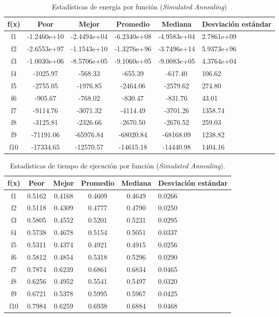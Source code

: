 \documentclass[12pt,twoside]{report}
\begin{document}
	\begin{table}[H]
		\centering
		\begin{tabular}{|c|c|c|c|c|p{2.1cm}|}  
			\hline
			\textbf{f(x)} & \textbf{Peor} & \textbf{Mejor} & \textbf{Promedio} & \textbf{Mediana} & \textbf{Desviación estándar} \\  
			\hline
			f1  & -1.2460e+10 & -2.4494e+04 & -6.2340e+08 & -4.9583e+04 & 2.7861e+09 \\
			f2  & -2.6553e+97  & -1.1543e+10  & -1.3276e+96  & -3.7496e+14  & 5.9373e+96 \\
			f3  & -1.0030e+06  & -8.5706e+05  & -9.1060e+05  & -9.0083e+05  & 4.3764e+04 \\
			f4  & -1025.97     & -568.33     & -655.39     & -617.40     & 106.62 \\
			f5  & -2755.05     & -1976.85    & -2464.06    & -2579.62    & 274.80 \\
			f6  & -905.67      & -768.02     & -830.47     & -831.76     & 43.01 \\
			f7  & -9114.76     & -3071.32    & -4114.49    & -3701.26    & 1358.74 \\
			f8  & -3125.81     & -2326.66    & -2670.50    & -2676.52    & 259.03 \\
			f9  & -71191.06    & -65976.84   & -68020.84   & -68168.09   & 1238.82 \\
			f10 & -17334.65    & -12570.57   & -14615.18   & -14440.98   & 1404.16 \\
			\hline
		\end{tabular}
		\caption{Estadísticas de energía por función (\textit{Simulated Annealing})}
		\label{tab:res_sa}
	\end{table}
	
	
	
	
	\begin{table}[H]
		\centering
		\begin{tabular}{|c|c|c|c|c|p{2.1cm}|}  
			\hline
			\textbf{f(x)} & \textbf{Peor} & \textbf{Mejor} & \textbf{Promedio} & \textbf{Mediana} & \textbf{Desviación estándar} \\  
			\hline
			f1  & 0.5162 & 0.4168 & 0.4609 & 0.4649 & 0.0266 \\
			f2  & 0.5118 & 0.4309 & 0.4777 & 0.4790 & 0.0250 \\
			f3  & 0.5805 & 0.4552 & 0.5201 & 0.5231 & 0.0295 \\
			f4  & 0.5738 & 0.4678 & 0.5154 & 0.5051 & 0.0337 \\
			f5  & 0.5311 & 0.4374 & 0.4921 & 0.4915 & 0.0256 \\
			f6  & 0.5812 & 0.4854 & 0.5318 & 0.5296 & 0.0290 \\
			f7  & 0.7874 & 0.6239 & 0.6861 & 0.6834 & 0.0465 \\
			f8  & 0.6256 & 0.4952 & 0.5541 & 0.5497 & 0.0320 \\
			f9  & 0.6721 & 0.5378 & 0.5995 & 0.5967 & 0.0425 \\
			f10 & 0.7984 & 0.6259 & 0.6938 & 0.6884 & 0.0468 \\
			\hline
		\end{tabular}
		\caption{Estadísticas de tiempo de ejecución por función (\textit{Simulated Annealing}).}
		\label{tab:time_sa}
	\end{table}
	
	
	
	
\end{document}
